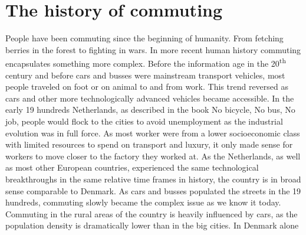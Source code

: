 \chapter{The history of commuting}
People have been commuting since the beginning of humanity. 
From fetching berries in the forest to fighting in wars. 
In more recent human history commuting encapsulates something more complex.
Before the information age in the 20\textsuperscript{th} century and before cars and busses were mainstream transport vehicles, most people traveled on foot or on animal to and from work.
This trend reversed as cars and other more technologically advanced vehicles became accessible.
In the early 19 hundreds Netherlands, as described in the book No bicycle, No bus, No job, people would flock to the cities to avoid unemployment as the industrial evolution was in full force.
As most worker were from a lower socioeconomic class with limited resources to spend on transport and luxury, it only made sense for workers to move closer to the factory they worked at.
As the Netherlands, as well as most other European countries, experienced the same technological breakthroughs in the same relative time frames in history, the country is in broad sense comparable to Denmark.
As cars and busses populated the streets in the 19 hundreds, commuting slowly became the complex issue as we know it today.
Commuting in the rural areas of the country is heavily influenced by cars, as the population density is dramatically lower than in the big cities.
In Denmark alone